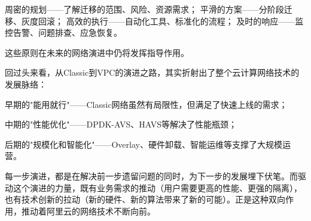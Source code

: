 周密的规划——了解迁移的范围、风险、资源需求；
平滑的方案——分阶段迁移、灰度回滚；
高效的执行——自动化工具、标准化的流程；
及时的响应——监控告警、问题排查、应急恢复。

这些原则在未来的网络演进中仍将发挥指导作用。

回过头来看，从Classic到VPC的演进之路，其实折射出了整个云计算网络技术的发展脉络：

早期的"能用就行"——Classic网络虽然有局限性，但满足了快速上线的需求；

中期的"性能优化"——DPDK-AVS、HAVS等解决了性能瓶颈；

后期的"规模化和智能化"——Overlay、硬件卸载、智能运维等支撑了大规模运营。

每一步演进，都是在解决前一步遗留问题的同时，为下一步的发展埋下伏笔。而驱动这个演进的力量，既有业务需求的推动（用户需要更高的性能、更强的隔离），也有技术创新的拉动（新的硬件、新的算法带来了新的可能）。正是这种双向作用，推动着阿里云的网络技术不断向前。

